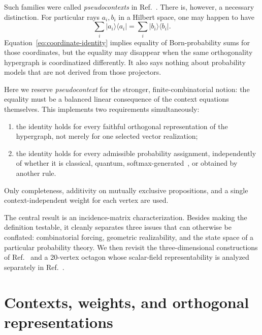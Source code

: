 \documentclass[
  twocolumn,
  aps,
  pra,
  floatfix,
  amsmath,amssymb,
  longbibliography
]{revtex4-2}
\theoremstyle{definition}
\theoremstyle{remark}
\begin{document}
Such families were called \emph{pseudocontexts} in
Ref.~\cite{2023-navara-svozil}.  There is, however, a necessary distinction.
For particular rays $a_i,b_i$ in a Hilbert space, one may happen to have
\begin{equation}
  \sum_i |a_i\rangle\!\langle a_i|
  =\sum_i |b_i\rangle\!\langle b_i|.
  \label{eq:coordinate-identity}
\end{equation}
Equation~\eqref{eq:coordinate-identity} implies equality of Born-probability
sums for those coordinates, but the equality may disappear when the same
orthogonality hypergraph is coordinatized differently.  It also says nothing
about probability models that are not derived from those projectors.

Here we reserve \emph{pseudocontext} for the stronger, finite-combinatorial
notion: the equality must be a balanced linear consequence of the context
equations themselves.  This implements two requirements simultaneously:
\begin{enumerate}
  \item the identity holds for every faithful orthogonal representation of the
        hypergraph, not merely for one selected vector realization;
  \item the identity holds for every admissible probability assignment,
        independently of whether it is classical, quantum, softmax-generated~\cite{svozil-2026-softmax},
        or obtained by another rule.
\end{enumerate}
Only completeness, additivity on mutually exclusive propositions, and a
single context-independent weight for each vertex are used.

The central result is an incidence-matrix characterization.  Besides making
the definition testable, it cleanly separates three issues that can otherwise
be conflated: combinatorial forcing, geometric realizability, and the state
space of a particular probability theory.  We then revisit the
three-dimensional constructions of Ref.~\cite{2023-navara-svozil} and a
20-vertex octagon whose scalar-field representability is analyzed
separately in Ref.~\cite{2026-Navara-Svozil-complex-only-3d-hypergraphs}.

\section{Contexts, weights, and orthogonal representations}
\label{sec:framework}
\end{document}
